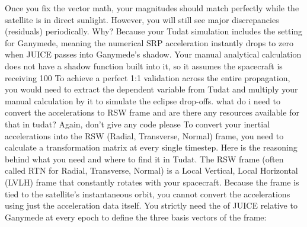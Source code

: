 {}
\markdownRendererSectionEnd \markdownRendererSectionBegin
{}\markdownRendererInterblockSeparator
{}Once you fix the vector math, your magnitudes should match perfectly while the satellite is in direct sunlight. However, you will still see major discrepancies (residuals) periodically.\markdownRendererInterblockSeparator
{}Why? Because your Tudat simulation includes the  setting for Ganymede, meaning the numerical SRP acceleration instantly drops to zero when JUICE passes into Ganymede's shadow. Your manual analytical calculation does not have a shadow function built into it, so it assumes the spacecraft is receiving 100\markdownRendererInterblockSeparator
{}To achieve a perfect 1:1 validation across the entire propagation, you would need to extract the  dependent variable from Tudat and multiply your manual calculation by it to simulate the eclipse drop-offs.\markdownRendererInterblockSeparator
{}\markdownRendererThematicBreak{}\markdownRendererInterblockSeparator
{}
\markdownRendererSectionEnd 
\markdownRendererSectionEnd \markdownRendererSectionBegin
{}\markdownRendererInterblockSeparator
{}what do i need to convert the accelerations to RSW frame and are there any resources available for that in tudat? Again, don't give any code please\markdownRendererInterblockSeparator
{}
\markdownRendererSectionEnd \markdownRendererSectionBegin
{}\markdownRendererInterblockSeparator
{}To convert your inertial accelerations into the RSW (Radial, Transverse, Normal) frame, you need to calculate a transformation matrix at every single timestep.\markdownRendererInterblockSeparator
{}Here is the reasoning behind what you need and where to find it in Tudat.\markdownRendererInterblockSeparator
{}\markdownRendererSectionBegin
{}\markdownRendererInterblockSeparator
{}The RSW frame (often called RTN for Radial, Transverse, Normal) is a Local Vertical, Local Horizontal (LVLH) frame that constantly rotates with your spacecraft.\markdownRendererInterblockSeparator
{}Because the frame is tied to the satellite's instantaneous orbit, you cannot convert the accelerations using just the acceleration data itself. You strictly need the  of JUICE relative to Ganymede at every epoch to define the three basis vectors of the frame:\markdownRendererInterblockSeparator
